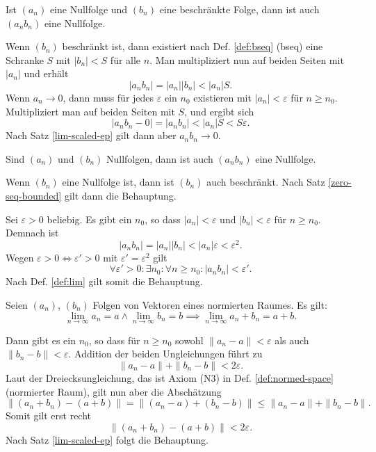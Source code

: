 \begin{Satz}\label{zero-seq-bounded}
Ist $(a_n)$ eine Nullfolge und $(b_n)$ eine beschränkte Folge,
dann ist auch $(a_n b_n)$ eine Nullfolge.
\end{Satz}

\begin{Beweis}
Wenn $(b_n)$ beschränkt ist, dann existiert nach
Def. \ref{def:bseq} (bseq) eine Schranke $S$ mit
$|b_n|<S$ für alle $n$. Man multipliziert nun auf beiden Seiten
mit $|a_n|$ und erhält
\[|a_n b_n| = |a_n| |b_n| < |a_n| S.\]
Wenn $a_n\to 0$, dann muss für jedes $\varepsilon$
ein $n_0$ existieren mit $|a_n|<\varepsilon$ für $n\ge n_0$.
Multipliziert man auf beiden Seiten mit $S$, und ergibt sich
\[|a_n b_n-0| = |a_n b_n| < |a_n| S < S\varepsilon.\]
Nach Satz \ref{lim-scaled-ep} gilt dann
aber $a_n b_n\to 0$.\,\qedsymbol
\end{Beweis}

\begin{Satz}
Sind $(a_n)$ und $(b_n)$ Nullfolgen,
dann ist auch $(a_n b_n)$ eine Nullfolge.
\end{Satz}

\begin{Beweis}[Beweis 1]
Wenn $(b_n)$ eine Nullfolge ist, dann ist $(b_n)$ auch beschränkt.
Nach Satz \ref{zero-seq-bounded} gilt dann die Behauptung.
\end{Beweis}

\begin{Beweis}[Beweis 2]
Sei $\varepsilon>0$ beliebig.
Es gibt ein $n_0$, so dass
$|a_n|<\varepsilon$ und $|b_n|<\varepsilon$ für $n\ge n_0$.
Demnach ist
\[|a_n b_n| = |a_n| |b_n|< |a_n|\varepsilon <\varepsilon^2.\]
Wegen $\varepsilon>0\iff\varepsilon'>0$ mit
$\varepsilon'=\varepsilon^2$ gilt
\[\forall\varepsilon'{>}0\colon\exists n_0\colon\forall n{\ge}n_0\colon
|a_n b_n|<\varepsilon'.\]
Nach Def. \ref{def:lim} gilt somit die Behauptung.\,\qedsymbol
\end{Beweis}

\newpage
\begin{Satz}%
\label{lim-add}
Seien $(a_n)$, $(b_n)$ Folgen von Vektoren eines normierten Raumes.
Es gilt:
\[\lim_{n\to\infty} a_n = a\land \lim_{n\to\infty} b_n
= b \implies \lim_{n\to\infty} a_n+b_n = a+b.\]
\end{Satz}

\begin{Beweis}
Dann gibt es ein $n_0$, so dass für $n\ge n_0$ sowohl
$\|a_n-a\|<\varepsilon$ als auch $\|b_n-b\|<\varepsilon$.
Addition der beiden Ungleichungen führt zu
\[\|a_n-a\| + \|b_n-b\| < 2\varepsilon.\]
Laut der Dreiecksungleichung, das ist Axiom (N3) in Def.
\ref{def:normed-space} (normierter Raum), gilt nun aber die Abschätzung
\[\|(a_n+b_n)-(a+b)\| = \|(a_n-a)+(b_n-b)\| \le \|a_n-a\|+\|b_n-b\|.\]
Somit gilt erst recht
\[\|(a_n+b_n)-(a+b)\| < 2\varepsilon.\]
Nach Satz \ref{lim-scaled-ep} folgt die Behauptung.\,\qedsymbol
\end{Beweis}

